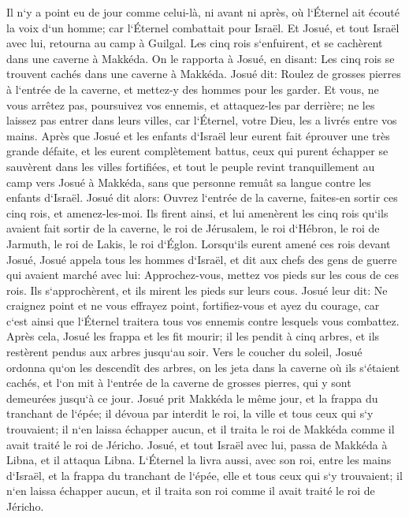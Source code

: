 \verse Il n`y a point eu de jour comme celui-là, ni avant ni après, où l`Éternel ait écouté la voix d`un homme; car l`Éternel combattait pour Israël. 
\verse Et Josué, et tout Israël avec lui, retourna au camp à Guilgal. 
\verse Les cinq rois s`enfuirent, et se cachèrent dans une caverne à Makkéda. 
\verse On le rapporta à Josué, en disant: Les cinq rois se trouvent cachés dans une caverne à Makkéda. 
\verse Josué dit: Roulez de grosses pierres à l`entrée de la caverne, et mettez-y des hommes pour les garder. 
\verse Et vous, ne vous arrêtez pas, poursuivez vos ennemis, et attaquez-les par derrière; ne les laissez pas entrer dans leurs villes, car l`Éternel, votre Dieu, les a livrés entre vos mains. 
\verse Après que Josué et les enfants d`Israël leur eurent fait éprouver une très grande défaite, et les eurent complètement battus, ceux qui purent échapper se sauvèrent dans les villes fortifiées, 
\verse et tout le peuple revint tranquillement au camp vers Josué à Makkéda, sans que personne remuât sa langue contre les enfants d`Israël. 
\verse Josué dit alors: Ouvrez l`entrée de la caverne, faites-en sortir ces cinq rois, et amenez-les-moi. 
\verse Ils firent ainsi, et lui amenèrent les cinq rois qu`ils avaient fait sortir de la caverne, le roi de Jérusalem, le roi d`Hébron, le roi de Jarmuth, le roi de Lakis, le roi d`Églon. 
\verse Lorsqu`ils eurent amené ces rois devant Josué, Josué appela tous les hommes d`Israël, et dit aux chefs des gens de guerre qui avaient marché avec lui: Approchez-vous, mettez vos pieds sur les cous de ces rois. Ils s`approchèrent, et ils mirent les pieds sur leurs cous. 
\verse Josué leur dit: Ne craignez point et ne vous effrayez point, fortifiez-vous et ayez du courage, car c`est ainsi que l`Éternel traitera tous vos ennemis contre lesquels vous combattez. 
\verse Après cela, Josué les frappa et les fit mourir; il les pendit à cinq arbres, et ils restèrent pendus aux arbres jusqu`au soir. 
\verse Vers le coucher du soleil, Josué ordonna qu`on les descendît des arbres, on les jeta dans la caverne où ils s`étaient cachés, et l`on mit à l`entrée de la caverne de grosses pierres, qui y sont demeurées jusqu`à ce jour. 
\verse Josué prit Makkéda le même jour, et la frappa du tranchant de l`épée; il dévoua par interdit le roi, la ville et tous ceux qui s`y trouvaient; il n`en laissa échapper aucun, et il traita le roi de Makkéda comme il avait traité le roi de Jéricho. 
\verse Josué, et tout Israël avec lui, passa de Makkéda à Libna, et il attaqua Libna. 
\verse L`Éternel la livra aussi, avec son roi, entre les mains d`Israël, et la frappa du tranchant de l`épée, elle et tous ceux qui s`y trouvaient; il n`en laissa échapper aucun, et il traita son roi comme il avait traité le roi de Jéricho. 
